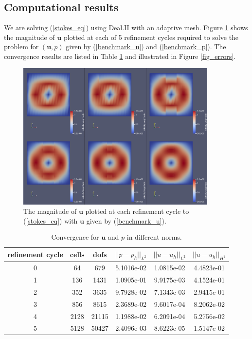 \documentclass[12pt,a4paper]{article}
\theoremstyle{definition}
\begin{document}
\subsection{Computational results}
We are solving (\ref{stokes_eq}) using Deal.II with an adaptive mesh.  Figure \ref{fig_stokes_sol}  shows the magnitude of $\textbf{u}$ plotted at each of 5 refinement cycles required to solve the problem for $\left(\textbf{u}, p\right)$ given by (\ref{benchmark_u}) and (\ref{benchmark_p}).  The convergence results are listed in Table \ref{tablebenchmark_convergence} and illustrated in Figure \ref{fig_errors}.
\begin{figure}[H]
	\centering
	\includegraphics[width=10cm]{stokes_cg_velocities}
	\caption{The magnitude of $\textbf{u}$ plotted at each refinement cycle to (\ref{stokes_eq}) with $\textbf{u}$ given by (\ref{benchmark_u}).}
	\label{fig_stokes_sol}
\end{figure}
\begin{table}[H]
	\begin{center}
		\begin{tabular}{|c|c|c|c|c|c|} \hline
	refinement cycle & cells & dofs & $||p-p_h||_{L^2}$ & $||u-u_h||_{L^2}$ & $||u-u_h||_{H^1}$\\ \hline
0 & 64 & 679 & 5.1016e-02 & 1.0815e-02 & 4.4823e-01\\ \hline
1 & 136 & 1431 & 1.0905e-01 & 9.9175e-03 & 4.1524e-01\\ \hline
2 & 352 & 3635 & 9.7928e-02 & 7.1343e-03 & 2.9415e-01\\ \hline
3 & 856 & 8615 & 2.3689e-02 & 9.6017e-04 & 8.2062e-02\\ \hline
4 & 2128 & 21115 & 1.1988e-02 & 6.2091e-04 & 5.2756e-02\\ \hline
5 & 5128 & 50427 & 2.4096e-03 & 8.6223e-05 & 1.5147e-02\\ \hline
		\end{tabular}
	\caption{Convergence for $\textbf{u}$ and $p$ in different norms.}
	\label{tablebenchmark_convergence}
	\end{center}
\end{table}
\end{document}
